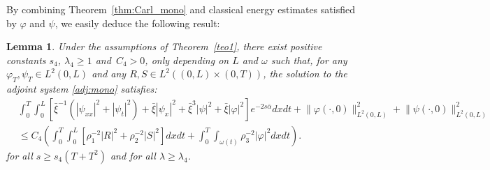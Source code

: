 \documentclass[10pt]{article}
\newtheorem{lemma}{Lemma}
\def\om{\omega}
\def\\Phivec{\mathbf{\Phi}}
\newcommand{\iiTL}{\int_0^T\!\!\!\!\int_0^L }
\begin{document}
	By combining Theorem~\ref{thm:Carl_mono} and classical energy estimates satisfied by $\varphi$ and $\psi$,
	we easily deduce the following result:
\begin{lemma}\label{theo:linearnullcontrol}
	Under the assumptions of Theorem~\emph{\ref{teo1}}, there exist positive constants
	 $s_4$, $\lambda_4\geq 1$ and~$C_4>0$, only depending on $L$ and $\omega$ such that, for any
	$\varphi _T,\psi_T \in L^2(0,L)$ and any $R,S\in L^2((0,L)\times(0,T))$, the solution to the adjoint system \eqref{adj:mono} 		satisfies:
\begin{equation}\label{carleman_0}
	\begin{alignedat}{2}
	&\!\!\!\!\!\iiTL\![{\bar\xi}^{-1}(|\psi_{xx}|^2\!+\!|\psi_t|^2)\!+\!\bar\xi|\psi_x|^2
		\!+\!\bar\xi^3|\psi|^2\!+\!\bar\xi  |\varphi |^2 ]e^{-2s\bar\alpha}dxdt
		+ \!\|\varphi(\cdot,0)\|^2_{L^2(0,L)}\!+\!\|\psi(\cdot,0)\|^2_{L^2(0,L)}\\
		&\le C_4
		\left(\iiTL\![\rho_1^{-2}|R|^2+\rho_2^{-2}|S|^2] dxdt +
		 \int_0^T \!\!\!\int_{\om(t)} \rho_3^{-2}|\varphi|^2  dxdt\right).
\end{alignedat}
\end{equation}
	for all  $s \geq  s_4(T + T^2) $ and for all $\lambda \geq \lambda_4$.
\end{lemma}
\end{document}
